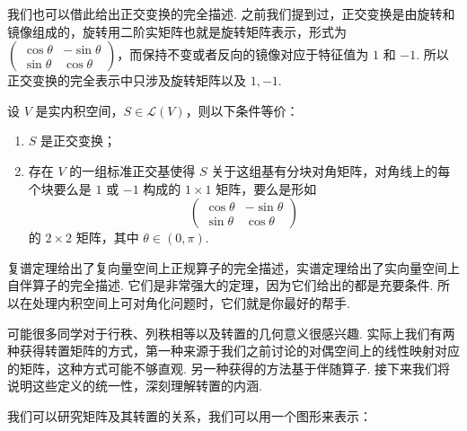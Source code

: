 我们也可以借此给出正交变换的完全描述. 之前我们提到过，正交变换是由旋转和镜像组成的，旋转用二阶实矩阵也就是旋转矩阵表示，形式为 $ \begin{pmatrix} \cos \theta & -\sin \theta \\ \sin \theta & \cos \theta \end{pmatrix} $，而保持不变或者反向的镜像对应于特征值为 $ 1 $ 和 $ -1 $. 所以正交变换的完全表示中只涉及旋转矩阵以及 $ 1, -1 $.

\begin{theorem}
    设 $ V $ 是实内积空间，$ S \in \mathcal{L}(V) $，则以下条件等价：
    \begin{enumerate}
        \item $ S $ 是正交变换；

        \item 存在 $ V $ 的一组标准正交基使得 $ S $ 关于这组基有分块对角矩阵，对角线上的每个块要么是 $ 1 $ 或 $ -1 $ 构成的 $ 1 \times 1 $ 矩阵，要么是形如
        \[
            \begin{pmatrix}
                \cos \theta & -\sin \theta \\
                \sin \theta & \cos \theta
            \end{pmatrix}
        \]
        的 $ 2 \times 2 $ 矩阵，其中 $ \theta \in (0, \pi) $.
    \end{enumerate}
\end{theorem}

复谱定理给出了复向量空间上正规算子的完全描述，实谱定理给出了实向量空间上自伴算子的完全描述. 它们是非常强大的定理，因为它们给出的都是充要条件. 所以在处理内积空间上可对角化问题时，它们就是你最好的帮手.

可能很多同学对于行秩、列秩相等以及转置的几何意义很感兴趣. 实际上我们有两种获得转置矩阵的方式，第一种来源于我们之前讨论的对偶空间上的线性映射对应的矩阵，这种方式可能不够直观. 另一种获得的方法基于伴随算子. 接下来我们将说明这些定义的统一性，深刻理解转置的内涵.

我们可以研究矩阵及其转置的关系，我们可以用一个图形来表示：

